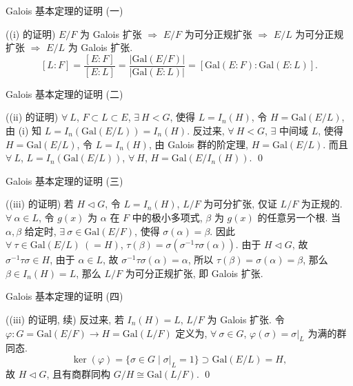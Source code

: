 \begin{frame}{Galois 基本定理的证明 (一)}

\startproof[bg=yellow, fg=red]((i) 的证明)
$E/F$ 为 Galois 扩张 $\Longrightarrow$ $E/F$ 为可分正规扩张
$\Longrightarrow$ $E/L$ 为可分正规扩张 $\Longrightarrow$ $E/L$ 为 Galois 扩张.
\[
[L:F] = \frac{[E:F]}{[E:L]} = \frac{|\mathrm{Gal}(E/F)|}{|\mathrm{Gal}(E:L)|}
= [\mathrm{Gal}(E:F) : \mathrm{Gal}(E:L)].
\]

\end{frame}


\begin{frame}{Galois 基本定理的证明 (二)}

\startproof[bg=yellow, fg=red]((ii) 的证明)
$\forall\ L$, $F \subset L \subset E$, $\exists\ H < G$, 使得 $L = I_n(H)$,
令 $H = \mathrm{Gal}(E/L)$, 由 (i) 知 $L = I_n(\mathrm{Gal}(E/L)) = I_n(H)$.
反过来, $\forall\ H < G$, $\exists$ 中间域 $L$, 使得 $H = \mathrm{Gal}(E/L)$,
令 $L = I_n(H)$, 由 Galois 群的阶定理, $H = \mathrm{Gal}(E/L)$.
而且 $\forall\ L$, $L = I_n(\mathrm{Gal}(E/L))$, $\forall\ H$,
$H = \mathrm{Gal}(E/I_n(H))$.
\qed

\end{frame}


\begin{frame}{Galois 基本定理的证明 (三)}

\startproof[bg=yellow, fg=red]((iii) 的证明)
若 $H \triangleleft G$, 令 $L = I_n(H)$, $L/F$ 为可分扩张, 仅证 $L/F$ 为正规的.
$\forall\ \alpha \in L$, 令 $g(x)$ 为 $\alpha$ 在 $F$ 中的极小多项式,
$\beta$ 为 $g(x)$ 的任意另一个根.
当 $\alpha, \beta$ 给定时, $\exists\ \sigma \in \mathrm{Gal}(E/F)$, 使得 $\sigma(\alpha) = \beta$.
因此 $\forall\ \tau \in \mathrm{Gal}(E/L)\ (=H)$,
$\tau(\beta) = \sigma(\sigma^{-1} \tau \sigma(\alpha))$.
由于 $H \triangleleft G$, 故 $\sigma^{-1} \tau \sigma \in H$,
由于 $\alpha \in L$, 故 $\sigma^{-1} \tau \sigma(\alpha) = \alpha$,
所以 $\tau(\beta) = \sigma(\alpha) = \beta$, 那么 $\beta \in I_n(H) = L$,
那么 $L/F$ 为可分正规扩张, 即 Galois 扩张.

\end{frame}


\begin{frame}{Galois 基本定理的证明 (四)}

\startproof[bg=yellow, fg=red]((iii) 的证明, 续)
反过来, 若 $I_n(H) = L$, $L/F$ 为 Galois 扩张.
令 $\varphi: G = \mathrm{Gal}(E/F) \longrightarrow H = \mathrm{Gal}(L/F)$
定义为, $\forall\ \sigma \in G$, $\varphi(\sigma) = \sigma|_L$ 为满的群同态.
\[
\ker(\varphi) = \{ \sigma \in G \mid \sigma|_L = 1 \} \supset \mathrm{Gal}(E/L) = H,
\]
故 $H \triangleleft G$, 且有商群同构 $G/H \cong \mathrm{Gal}(L/F)$.
\qed

\end{frame}

